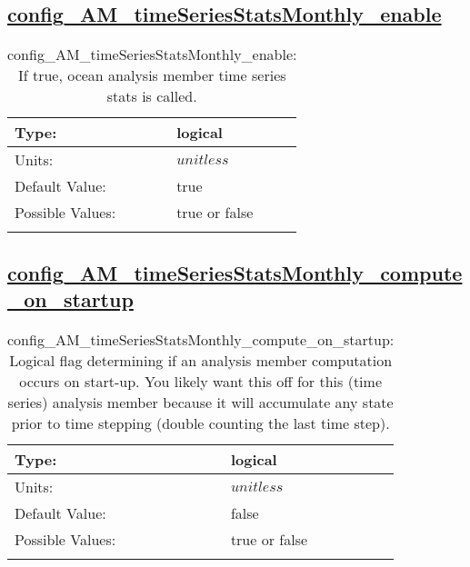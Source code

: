 \subsection[config\_AM\_timeSeriesStatsMonthly\_enable]{\hyperref[sec:nm_tab_AM_timeSeriesStatsMonthly]{config\_AM\_timeSeriesStatsMonthly\_enable}}
\label{subsec:nm_sec_config_AM_timeSeriesStatsMonthly_enable}
\begin{center}
\begin{longtable}{| p{2.0in} || p{4.0in} |}
    \hline
    Type: & logical \\
    \hline
    Units: & $unitless$ \\
    \hline
    Default Value: & true \\
    \hline
    Possible Values: & true or false \\
    \hline
    \caption{config\_AM\_timeSeriesStatsMonthly\_enable: If true, ocean analysis member time series stats is called.}
\end{longtable}
\end{center}
\subsection[config\_AM\_timeSeriesStatsMonthly\_compute\_on\_startup]{\hyperref[sec:nm_tab_AM_timeSeriesStatsMonthly]{config\_AM\_timeSeriesStatsMonthly\_compute\_on\_startup}}
\label{subsec:nm_sec_config_AM_timeSeriesStatsMonthly_compute_on_startup}
\begin{center}
\begin{longtable}{| p{2.0in} || p{4.0in} |}
    \hline
    Type: & logical \\
    \hline
    Units: & $unitless$ \\
    \hline
    Default Value: & false \\
    \hline
    Possible Values: & true or false \\
    \hline
    \caption{config\_AM\_timeSeriesStatsMonthly\_compute\_on\_startup: Logical flag determining if an analysis member computation occurs on start-up. You likely want this off for this (time series) analysis member because it will accumulate any state prior to time stepping (double counting the last time step).}
\end{longtable}
\end{center}
